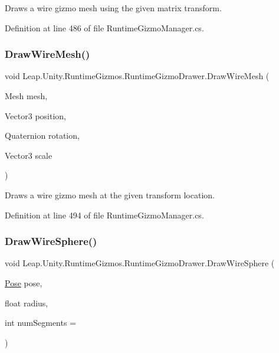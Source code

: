 Draws a wire gizmo mesh using the given matrix transform. 



Definition at line 486 of file Runtime\+Gizmo\+Manager.\+cs.

\mbox{\label{class_leap_1_1_unity_1_1_runtime_gizmos_1_1_runtime_gizmo_drawer_a38092dc098f2c70e15b14e671e3213a4}} 
\subsubsection{\texorpdfstring{DrawWireMesh()}{DrawWireMesh()}\hspace{0.1cm}{\footnotesize\ttfamily [2/2]}}
{\footnotesize\ttfamily void Leap.\+Unity.\+Runtime\+Gizmos.\+Runtime\+Gizmo\+Drawer.\+Draw\+Wire\+Mesh (\begin{DoxyParamCaption}\item[{Mesh}]{mesh,  }\item[{Vector3}]{position,  }\item[{Quaternion}]{rotation,  }\item[{Vector3}]{scale }\end{DoxyParamCaption})}



Draws a wire gizmo mesh at the given transform location. 



Definition at line 494 of file Runtime\+Gizmo\+Manager.\+cs.

\mbox{\label{class_leap_1_1_unity_1_1_runtime_gizmos_1_1_runtime_gizmo_drawer_a37f724a49840d699acbfb538883132ef}} 
\subsubsection{\texorpdfstring{DrawWireSphere()}{DrawWireSphere()}\hspace{0.1cm}{\footnotesize\ttfamily [1/2]}}
{\footnotesize\ttfamily void Leap.\+Unity.\+Runtime\+Gizmos.\+Runtime\+Gizmo\+Drawer.\+Draw\+Wire\+Sphere (\begin{DoxyParamCaption}\item[{\mbox{\hyperlink{struct_leap_1_1_unity_1_1_pose}{Pose}}}]{pose,  }\item[{float}]{radius,  }\item[{int}]{num\+Segments = {} }\end{DoxyParamCaption})}



